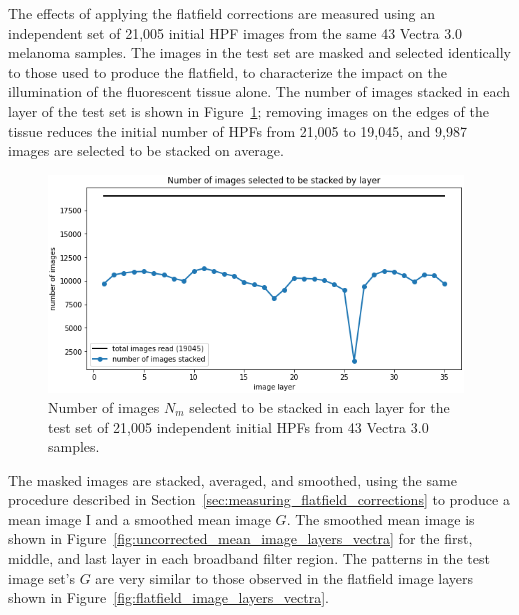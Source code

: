 \documentclass[letterpaper,11pt]{article}
\newcommand{\reffig}[1]{Figure~\ref{#1}}
\newcommand{\refsec}[1]{Section~\ref{#1}}
\newcommand{\Iota}{\mathrm{I}}
\begin{document}
The effects of applying the flatfield corrections are measured using an independent set of 21,005 initial HPF images from the same 43 Vectra 3.0 melanoma samples. The images in the test set are masked and selected identically to those used to produce the flatfield, to characterize the impact on the illumination of the fluorescent tissue alone. The number of images stacked in each layer of the test set is shown in \reffig{fig:test_set_n_images_stacked_vectra}; removing images on the edges of the tissue reduces the initial number of HPFs from 21,005 to 19,045, and 9,987 images are selected to be stacked on average.

\begin{figure}[!ht]
\centering
\includegraphics[width=0.98\textwidth]{images/results/n_images_stacked_per_layer_test_set_vectra}
\caption{\footnotesize Number of images $N_{m}$ selected to be stacked in each layer for the test set of 21,005 independent initial HPFs from 43 Vectra 3.0 samples.}
\label{fig:test_set_n_images_stacked_vectra}
\end{figure} 

The masked images are stacked, averaged, and smoothed, using the same procedure described in \refsec{sec:measuring_flatfield_corrections} to produce a mean image $\Iota$ and a smoothed mean image $G$. The smoothed mean image is shown in \reffig{fig:uncorrected_mean_image_layers_vectra} for the first, middle, and last layer in each broadband filter region. The patterns in the test image set's $G$ are very similar to those observed in the flatfield image layers shown in \reffig{fig:flatfield_image_layers_vectra}. 
\end{document}
